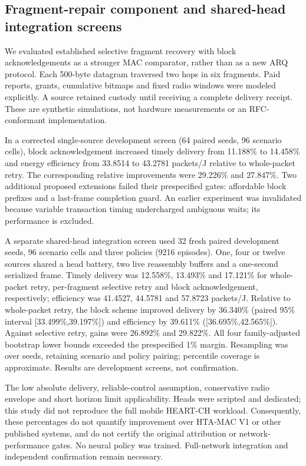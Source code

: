 \subsection{Fragment-repair component and shared-head integration screens}
We evaluated established selective fragment recovery with block acknowledgements
as a stronger MAC comparator, rather than as a new ARQ protocol. Each 500-byte
datagram traversed two hops in six fragments. Paid reports, grants, cumulative
bitmaps and fixed radio windows were modeled explicitly. A source retained custody
until receiving a complete delivery receipt. These are synthetic simulations,
not hardware measurements or an RFC-conformant implementation.

In a corrected single-source development screen (64 paired seeds, 96 scenario
cells), block acknowledgement increased timely delivery from 11.188\% to
14.458\% and energy efficiency from 33.8514 to 43.2781 packets/J relative to
whole-packet retry. The corresponding relative improvements were 29.226\% and
27.847\%. Two additional proposed extensions failed their prespecified gates:
affordable block prefixes and a last-frame completion guard. An earlier experiment
was invalidated because variable transaction timing undercharged ambiguous waits;
its performance is excluded.

A separate shared-head integration screen used 32 fresh paired development seeds,
96 scenario cells and three policies (9216 episodes). One, four or twelve sources
shared a head battery, two live reassembly buffers and a one-second serialized
frame. Timely delivery was 12.558\%, 13.493\% and 17.121\% for whole-packet retry,
per-fragment selective retry and block acknowledgement, respectively; efficiency
was 41.4527, 44.5781 and 57.8723 packets/J. Relative to whole-packet retry, the
block scheme improved delivery by 36.340\% (paired 95\% interval
[33.499\%,39.197\%]) and efficiency by 39.611\% ([36.695\%,42.565\%]).
Against selective retry, gains were 26.892\% and 29.822\%. All four
family-adjusted bootstrap lower bounds exceeded the prespecified 1\% margin.
Resampling was over seeds, retaining scenario and policy pairing; percentile
coverage is approximate. Results are development screens, not confirmation.

The low absolute delivery, reliable-control assumption, conservative radio
envelope and short horizon limit applicability. Heads were scripted and dedicated;
this study did not reproduce the full mobile HEART-CH workload. Consequently,
these percentages do not quantify improvement over HTA-MAC V1 or other published
systems, and do not certify the original attribution or network-performance
gates. No neural policy was trained. Full-network integration and independent
confirmation remain necessary.
